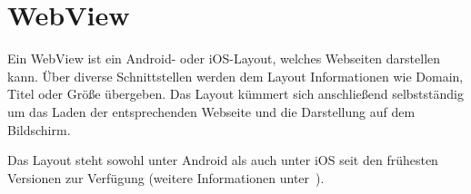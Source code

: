 \section{WebView}
Ein WebView ist ein Android- oder iOS-Layout, welches Webseiten darstellen kann. Über diverse Schnittstellen werden dem
Layout Informationen wie Domain, Titel oder Größe übergeben. Das Layout kümmert sich anschließend selbstständig um das
Laden der entsprechenden Webseite und die Darstellung auf dem Bildschirm.

Das Layout steht sowohl unter Android als auch unter iOS seit den frühesten Versionen zur Verfügung (weitere
Informationen unter~\cite{online_grundlagen_webview}).